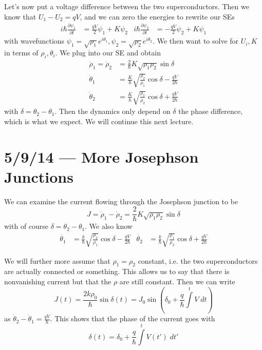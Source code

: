 \documentclass[10pt]{report}
\newcommand{\pd}[2]{\frac{\partial #1}{\partial#2}}
\begin{document}
Let's now put a voltage difference between the two superconductors. Then we know that $U_1 - U_2 = qV$, and we can zero the energies to rewrite our SEs
\begin{align}
    i\hbar \pd{\psi_1}{t} &= \frac{qV}{2}\psi_1 + K\psi_2 & i\hbar \pd{\psi_2}{t} &= -\frac{qV}{2}\psi_2 + K\psi_1
\end{align}
with wavefunctions $\psi_1 = \sqrt{\rho_1}e^{i\theta_1}, \psi_2 = \sqrt{\rho_2}e^{i\theta_2}$. We then want to solve for $U_i, K$ in terms of $\rho_i, \theta_i$. We plug into our SE and obtain
\begin{align}
    \dot{\rho}_1 = \dot{\rho}_2 &= \frac{2}{\hbar}K\sqrt{\rho_1\rho_2}\sin \delta\\
    \dot{\theta}_1 &= \frac{K}{\hbar}\sqrt{\frac{\rho_2}{\rho_1}}\cos\delta - \frac{qV}{2\hbar}\\
    \dot{\theta}_2 &= \frac{K}{\hbar}\sqrt{\frac{\rho_1}{\rho_2}}\cos\delta + \frac{qV}{2\hbar}
\end{align}
with $\delta = \theta_2 - \theta_1$. Then the dynamics only depend on $\delta$ the phase difference, which is what we expect. We will continue this next lecture.
\chapter{5/9/14 --- More Josephson Junctions}

We can examine the current flowing through the Josephson junction to be
\begin{equation}
    J = \dot{\rho}_1 - \dot{\rho}_2 = \frac{2}{\hbar}K\sqrt{\rho_1\rho_2} \sin \delta
\end{equation}
with of course $\delta = \theta_2 - \theta_1$. We also know
\begin{align}
    \dot{\theta_1} &= \frac{k}{\hbar}\sqrt{\frac{\rho_2}{\rho_1}}\cos\delta - \frac{qV}{2\hbar} & \dot{\theta_2} &= \frac{k}{\hbar}\sqrt{\frac{\rho_1}{\rho_2}}\cos\delta + \frac{qV}{2\hbar}
\end{align}

We will further more assume that $\rho_1 = \rho_2$ constant, i.e. the two superconductors are actually connected or something. This allows us to say that there is nonvanishing current but that the $\rho$ are still constant. Then we can write
\begin{equation}
    J(t) = \frac{2k\rho_0}{\hbar}\sin \delta(t) = J_0\sin\left(\delta_0 + \frac{q}{\hbar}\int\limits^t V\; dt\right)
\end{equation}
as $\dot{\theta}_2 - \dot{\theta}_1 = \frac{qV}{\hbar}$. This shows that the phase of the current goes with
\begin{equation}
    \delta(t) = \delta_0 + \frac{q}{\hbar}\int\limits_{}^{t}V(t')\;dt'
\end{equation}
\end{document}
